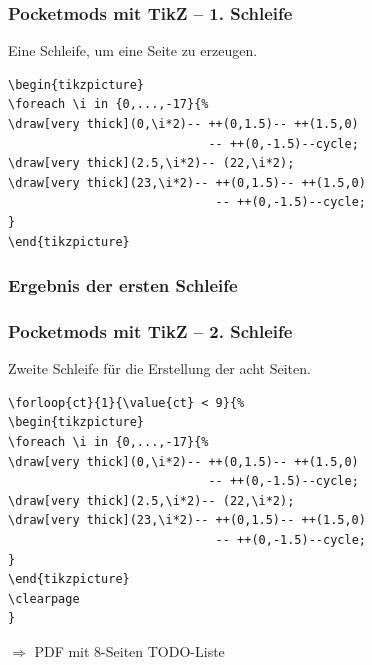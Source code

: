 \documentclass[12pt,ngerman]{beamer}
\begin{document}
\begin{frame}[containsverbatim]
\frametitle{Pocketmods mit TikZ -- 1. Schleife}

Eine Schleife, um eine Seite zu erzeugen.

\begin{lstlisting}[basicstyle=\ttfamily\footnotesize]
\begin{tikzpicture}
\foreach \i in {0,...,-17}{%
\draw[very thick](0,\i*2)-- ++(0,1.5)-- ++(1.5,0)
                            -- ++(0,-1.5)--cycle; 
\draw[very thick](2.5,\i*2)-- (22,\i*2);
\draw[very thick](23,\i*2)-- ++(0,1.5)-- ++(1.5,0) 
                             -- ++(0,-1.5)--cycle; 
}
\end{tikzpicture}
\end{lstlisting}
\end{frame}


\begin{frame}[containsverbatim]
\frametitle{Ergebnis der ersten Schleife}

\begin{center}
\end{center}

\end{frame}



\begin{frame}[containsverbatim]
\frametitle{Pocketmods mit TikZ -- 2. Schleife}

Zweite Schleife für die Erstellung der acht Seiten.
\begin{lstlisting}[basicstyle=\ttfamily\footnotesize]
\forloop{ct}{1}{\value{ct} < 9}{%
\begin{tikzpicture}
\foreach \i in {0,...,-17}{%
\draw[very thick](0,\i*2)-- ++(0,1.5)-- ++(1.5,0)
                            -- ++(0,-1.5)--cycle; 
\draw[very thick](2.5,\i*2)-- (22,\i*2);
\draw[very thick](23,\i*2)-- ++(0,1.5)-- ++(1.5,0) 
                             -- ++(0,-1.5)--cycle; 
}
\end{tikzpicture}
\clearpage
}
\end{lstlisting}

$\Rightarrow$ PDF mit 8-Seiten TODO-Liste

\end{frame}
\end{document}

